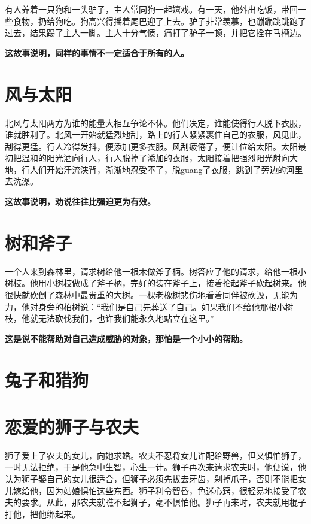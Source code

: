 有人养着一只狗和一头驴子，主人常同狗一起嬉戏。有一天，他外出吃饭，带回一些食物，扔给狗吃。狗高兴得摇着尾巴迎了上去。驴子非常羡慕，也蹦蹦跳跳跑了过去，结果踢了主人一脚。主人十分气愤，痛打了驴子一顿，并把它拴在马槽边。

{\bfseries \color{red}这故事说明，同样的事情不一定适合于所有的人。}

\section{风与太阳}

北风与太阳两方为谁的能量大相互争论不休。他们决定，谁能使得行人脱下衣服，谁就胜利了。北风一开始就猛烈地刮，路上的行人紧紧裹住自己的衣服，风见此，刮得更猛。行人冷得发抖，便添加更多衣服。风刮疲倦了，便让位给太阳。太阳最初把温和的阳光洒向行人，行人脱掉了添加的衣服，太阳接着把强烈阳光射向大地，行人们开始汗流浃背，渐渐地忍受不了，脱guang了衣服，跳到了旁边的河里去洗澡。

{\bfseries \color{red}这故事说明，劝说往往比强迫更为有效。}

\section{树和斧子}

一个人来到森林里，请求树给他一根木做斧子柄。树答应了他的请求，给他一根小树枝。他用小树枝做成了斧子柄，完好的装在斧子上，接着抡起斧子砍起树来。他很快就砍倒了森林中最贵重的大树。一棵老橡树悲伤地看着同伴被砍毁，无能为力，他对身旁的柏树说：“我们是自己先葬送了自己。如果我们不给他那根小树枝，他就无法砍伐我们，也许我们能永久地站立在这里。”

{\bfseries \color{red}这是说不能帮助对自己造成威胁的对象，那怕是一个小小的帮助。}

\section{兔子和猎狗}



{\bfseries \color{red}}

\section{恋爱的狮子与农夫}

狮子爱上了农夫的女儿，向她求婚。农夫不忍将女儿许配给野兽，但又惧怕狮子，一时无法拒绝，于是他急中生智，心生一计。狮子再次来请求农夫时，他便说，他认为狮子娶自己的女儿很适合，但狮子必须先拔去牙齿，剁掉爪子，否则不能把女儿嫁给他，因为姑娘惧怕这些东西。狮子利令智昏，色迷心窍，很轻易地接受了农夫的要求。从此，那农夫就瞧不起狮子，毫不惧怕他。狮子再来时，农夫就用棍子打他，把他绑起来。

